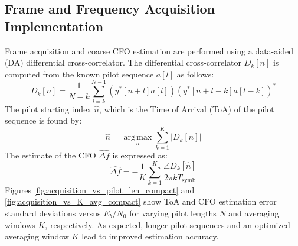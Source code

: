 \documentclass[11pt]{article}
\begin{document}
	\subsection{Frame and Frequency Acquisition Implementation}		
	Frame acquisition and coarse CFO estimation are performed using a data-aided (DA) differential cross-correlator. The differential cross-correlator $D_k[n]$ is computed from the known pilot sequence $a[l]$ as follows:
	\begin{equation}
		D_k[n] = \frac{1}{N-k} \sum_{l=k}^{N-1} (y^*[n+l]a[l])(y^*[n+l-k]a[l-k])^* \label{eq:diff_corr_metric_style_change}
	\end{equation}
	The pilot starting index $\hat{n}$, which is the Time of Arrival (ToA) of the pilot sequence is found by:
	\begin{equation} \hat{n} = \operatorname*{arg\,max}_n \sum_{k=1}^{K} |D_k[n]| \end{equation}
	The estimate of the CFO $\hat{\Delta f}$ is expressed as:
	\begin{equation} \hat{\Delta f} = -\frac{1}{K} \sum_{k=1}^{K} \frac{\angle D_k[\hat{n}]}{2\pi k T_{\text{symb}}} \end{equation}
	Figures \ref{fig:acquisition_vs_pilot_len_compact} and \ref{fig:acquisition_vs_K_avg_compact} show ToA and CFO estimation error standard deviations versus $E_b/N_0$ for varying pilot lengths $N$ and averaging windows $K$, respectively. As expected, longer pilot sequences and an optimized averaging window $K$  lead to improved estimation accuracy.
			
\end{document}
